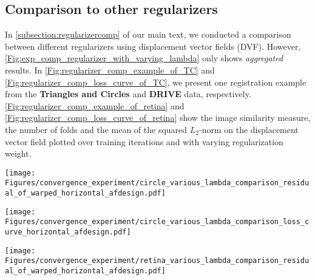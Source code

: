 \subsection{Comparison to other regularizers}
\label{sec:appendix_comparing_to_other_regularizers}
In \ref{subsection:regularizercomp} of our main text, we conducted a comparison between different regularizers using displacement vector fields (DVF). However, \ref{Fig:exp_comp_regularizer_with_varying_lambda} only shows \emph{aggregated} results. In  \ref{Fig:regularizer_comp_example_of_TC} and \ref{Fig:regularizer_comp_loss_curve_of_TC}, we present
one registration example from the \textbf{Triangles and Circles} and \textbf{DRIVE} data, respectively. \ref{Fig:regularizer_comp_example_of_retina} and \ref{Fig:regularizer_comp_loss_curve_of_retina} show the image similarity measure, the number of folds and the mean of the squared $L_2$-norm on the displacement vector field plotted over training iterations and with varying regularization weight.
\begin{figure*}[b]
	\centering
	\texttt{[image: Figures/convergence\_experiment/circle\_various\_lambda\_comparison\_residual\_of\_warped\_horizontal\_afdesign.pdf]}
	\vspace{0.2cm}
	\caption{Illustration of one \emph{warped source image} and the corresponding transformation maps for different regularizers across varying regularization strengths on {\bf Triangles and Circles}. \emph{Best-viewed in color.}}
	\label{Fig:regularizer_comp_example_of_TC}
\end{figure*}
\begin{figure*}[b]
	\centering
	\texttt{[image: Figures/convergence\_experiment/circle\_various\_lambda\_comparison\_loss\_curve\_horizontal\_afdesign.pdf]}
	\vspace{0.1cm}
	\caption{Illustration of image (dis)similarity (\ie, $1-\text{LNCC}$), the number of folds (Folds), and the mean of the squared $L^2$ norm of the displacement vector field (Magnitude) for different regularizers and across varying regularization strengths on {\bf Triangles and Circles}. \emph{Best-viewed in color.}}
	\label{Fig:regularizer_comp_loss_curve_of_TC}
\end{figure*}
\begin{figure*}[b]
	\centering
	\texttt{[image: Figures/convergence\_experiment/retina\_various\_lambda\_comparison\_residual\_of\_warped\_horizontal\_afdesign.pdf]}
	\vspace{0.2cm}
	\caption{Illustration of the \emph{residual error} and the corresponding transformation maps between the \emph{warped source image} and the \emph{target image} for different regularizers across varying regularization strengths on {\bf DRIVE}. \emph{Best-viewed in color.}}
	\label{Fig:regularizer_comp_example_of_retina}
\end{figure*}
